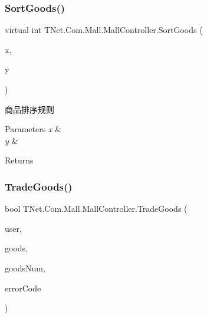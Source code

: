\subsubsection{\texorpdfstring{Sort\+Goods()}{SortGoods()}}
{\footnotesize\ttfamily virtual int T\+Net.\+Com.\+Mall.\+Mall\+Controller.\+Sort\+Goods (\begin{DoxyParamCaption}\item[{\mbox{\hyperlink{class_t_net_1_1_com_1_1_model_1_1_goods_data}{Goods\+Data}}}]{x,  }\item[{\mbox{\hyperlink{class_t_net_1_1_com_1_1_model_1_1_goods_data}{Goods\+Data}}}]{y }\end{DoxyParamCaption})\hspace{0.3cm}{\ttfamily [virtual]}}



商品排序规则 


\begin{DoxyParams}{Parameters}
{\em x} & \\
\hline
{\em y} & \\
\hline
\end{DoxyParams}
\begin{DoxyReturn}{Returns}

\end{DoxyReturn}
\mbox{\label{class_t_net_1_1_com_1_1_mall_1_1_mall_controller_aa9318fbb45e817b88ccbaaf88c2c9ab0}} 
\subsubsection{\texorpdfstring{Trade\+Goods()}{TradeGoods()}}
{\footnotesize\ttfamily bool T\+Net.\+Com.\+Mall.\+Mall\+Controller.\+Trade\+Goods (\begin{DoxyParamCaption}\item[{\mbox{\hyperlink{class_t_net_1_1_context___1_1_base_user}{Base\+User}}}]{user,  }\item[{\mbox{\hyperlink{class_t_net_1_1_com_1_1_model_1_1_goods_data}{Goods\+Data}}}]{goods,  }\item[{int}]{goods\+Num,  }\item[{out \mbox{\hyperlink{namespace_t_net_1_1_com_1_1_mall_a8ed58f71da1d1495830104612fc5667a}{Trade\+Error\+Code}}}]{error\+Code }\end{DoxyParamCaption})}



